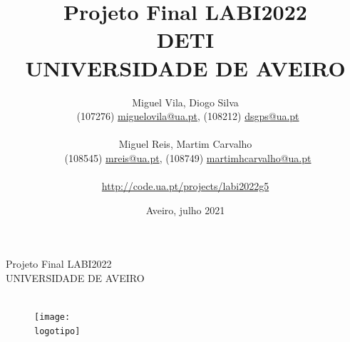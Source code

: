 \documentclass{report}
\begin{document}
\def\titulo{Projeto Final LABI2022}
\def\data{Aveiro, julho 2021}
\def\autoresa{Miguel Vila, Diogo Silva}
\def\autoresb{Miguel Reis, Martim Carvalho}
\def\autoresacontactos{(107276) \href{mailto:miguelovila@ua.pt}{miguelovila@ua.pt}, (108212) \href{mailto:dsgps@ua.pt}{dsgps@ua.pt}}
\def\autoresbcontactos{(108545) \href{mailto:mreis@ua.pt}{mreis@ua.pt}, (108749) \href{mailto:martimhcarvalho@ua.pt}{martimhcarvalho@ua.pt}}
\def\projetocodeua{\url{http://code.ua.pt/projects/labi2022g5}}
\def\departamento{DETI}
\def\empresa{UNIVERSIDADE DE AVEIRO}
\def\logotipo{ua.pdf}

\begin{titlepage}
\begin{center}
\vspace*{20mm}
{\Huge \titulo}\\ 
\vspace{10mm}
{\Large \empresa}\\
\vspace{10mm}
{\LARGE \autores}\\ 
\vspace{30mm}
\begin{figure}[h]
\center
\texttt{[image: \\logotipo]}
\end{figure}
\vspace{20mm}
\end{center}
\begin{flushright}
\end{flushright}
\end{titlepage}

\begin{titlepage}
\title{%
{\Huge\textbf{\titulo}}\\
{\Large \departamento\\ \empresa}
}
\author{
  \autoresa\\\
  \autoresacontactos\\\\
  \autoresb\\\
  \autoresbcontactos\\\\
  \projetocodeua
}
\date{\data}
\maketitle
{}
\end{titlepage}


\tableofcontents
\end{document}
